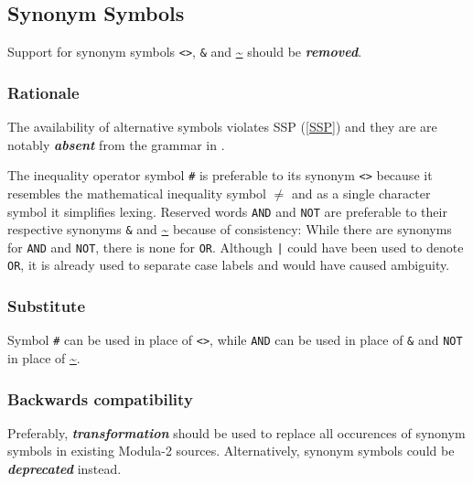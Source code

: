 \documentclass[10pt,a4paper]{article}
\renewcommand{\emph}[1]{\textbf{\textit{#1}}}
\begin{document}
\subsection{Synonym Symbols}

Support for synonym symbols \verb|<>|, \verb|&| and \url{~} should be
\emph{removed}.

\subsubsection{Rationale}

The availability of alternative symbols violates SSP (\ref{SSP}) and they are
are notably \emph{absent} from the grammar in \cite[pp.156-157]{Wirth88}.

The inequality operator symbol \verb|#| is preferable to its synonym \verb|<>|
because it resembles the mathematical inequality symbol \footnotesize
\raisebox{0.35ex} {$\neq$} \normalsize and as a single character symbol it 
simplifies lexing. Reserved words \verb|AND| and \verb|NOT| are preferable to
their respective synonyms \verb|&| and \url{~} because of consistency: While
there are synonyms for \verb|AND| and \verb|NOT|, there is none for \verb|OR|.
Although \verb!|! could have been used to denote \verb|OR|, it is already used
to separate case labels and would have caused ambiguity.

\subsubsection{Substitute}

Symbol \verb|#| can be used in place of \verb|<>|, while \verb|AND| can be used
in place of \verb|&| and \verb|NOT| in place of \url{~}.

\subsubsection{Backwards compatibility}

Preferably, \emph{transformation} should be used to replace all occurences of
synonym symbols in existing Modula-2 sources. Alternatively, synonym symbols
could be \emph{deprecated} instead.


\end{document}
